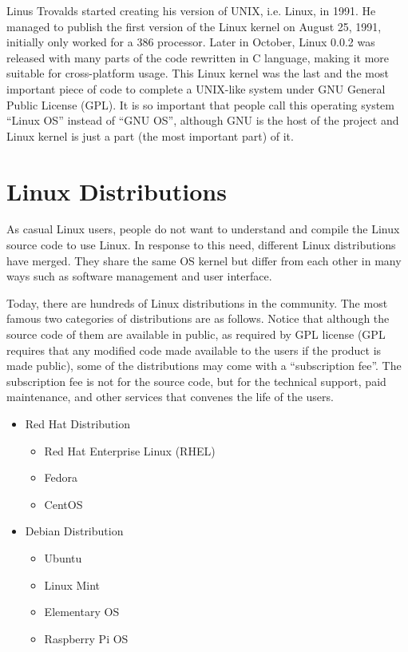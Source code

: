 Linus Trovalds started creating his version of UNIX, i.e. Linux, in 1991. He managed to publish the first version of the Linux kernel on August 25, 1991, initially only worked for a 386 processor. Later in October, Linux 0.0.2 was released with many parts of the code rewritten in C language, making it more suitable for cross-platform usage. This Linux kernel was the last and the most important piece of code to complete a UNIX-like system under GNU General Public License (GPL). It is so important that people call this operating system ``Linux OS'' instead of ``GNU OS'', although GNU is the host of the project and Linux kernel is just a part (the most important part) of it.

\section{Linux Distributions}

As casual Linux users, people do not want to understand and compile the Linux source code to use Linux. In response to this need, different Linux distributions have merged. They share the same OS kernel but differ from each other in many ways such as software management and user interface.

Today, there are hundreds of Linux distributions in the community. The most famous two categories of distributions are as follows. Notice that although the source code of them are available in public, as required by GPL license (GPL requires that any modified code made available to the users if the product is made public), some of the distributions may come with a ``subscription fee''. The subscription fee is not for the source code, but for the technical support, paid maintenance, and other services that convenes the life of the users.
\begin{itemize}
  \item Red Hat Distribution
  \begin{itemize}
    \item Red Hat Enterprise Linux (RHEL)
    \item Fedora
    \item CentOS
  \end{itemize}
  \item Debian Distribution
  \begin{itemize}
    \item Ubuntu
    \item Linux Mint
    \item Elementary OS
    \item Raspberry Pi OS
  \end{itemize}
\end{itemize}

